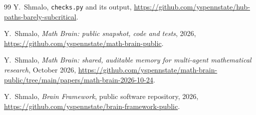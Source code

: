 \documentclass[11pt]{amsart}
\theoremstyle{definition}
\theoremstyle{remark}
\numberwithin{equation}{section}
\begin{document}
\begin{thebibliography}{99}
 Y.~Shmalo, \texttt{checks.py} and its output, \url{https://github.com/yspennstate/hub-paths-barely-subcritical}.

 Y.~Shmalo, \emph{Math Brain: public snapshot, code and tests}, 2026, \url{https://github.com/yspennstate/math-brain-public}.

 Y.~Shmalo, \emph{Math Brain: shared, auditable memory for multi-agent mathematical research}, October 2026, \url{https://github.com/yspennstate/math-brain-public/tree/main/papers/math-brain-2026-10-24}.

 Y.~Shmalo, \emph{Brain Framework}, public software repository, 2026, \url{https://github.com/yspennstate/brain-framework-public}.

\end{thebibliography}
\end{document}
